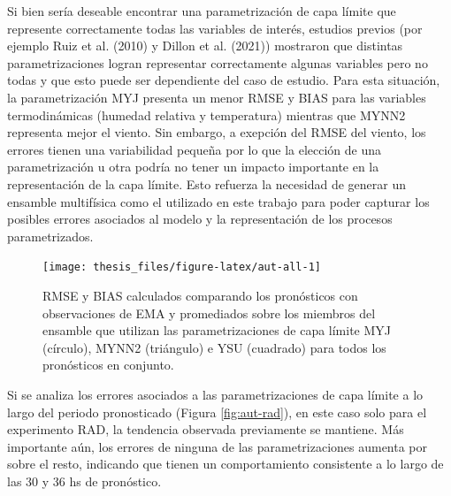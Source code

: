 \documentclass[12pt,oneside,a4paper]{reedthesis}
\begin{document}
Si bien sería deseable encontrar una parametrización de capa límite que represente correctamente todas las variables de interés, estudios previos (por ejemplo Ruiz et al. (2010) y Dillon et al. (2021)) mostraron que distintas parametrizaciones logran representar correctamente algunas variables pero no todas y que esto puede ser dependiente del caso de estudio. Para esta situación, la parametrización MYJ presenta un menor RMSE y BIAS para las variables termodinámicas (humedad relativa y temperatura) mientras que MYNN2 representa mejor el viento. Sin embargo, a exepción del RMSE del viento, los errores tienen una variabilidad pequeña por lo que la elección de una parametrización u otra podría no tener un impacto importante en la representación de la capa límite. Esto refuerza la necesidad de generar un ensamble multifísica como el utilizado en este trabajo para poder capturar los posibles errores asociados al modelo y la representación de los procesos parametrizados.


\begin{figure}

{\centering \texttt{[image: thesis\_files/figure-latex/aut-all-1]} 

}

\caption{RMSE y BIAS calculados comparando los pronósticos con observaciones de EMA y promediados sobre los miembros del ensamble que utilizan las parametrizaciones de capa límite MYJ (círculo), MYNN2 (triángulo) e YSU (cuadrado) para todos los pronósticos en conjunto.}\label{fig:aut-all}
\end{figure}
Si se analiza los errores asociados a las parametrizaciones de capa límite a lo largo del periodo pronosticado (Figura \ref{fig:aut-rad}), en este caso solo para el experimento RAD, la tendencia observada previamente se mantiene. Más importante aún, los errores de ninguna de las parametrizaciones aumenta por sobre el resto, indicando que tienen un comportamiento consistente a lo largo de las 30 y 36 hs de pronóstico.
\end{document}
